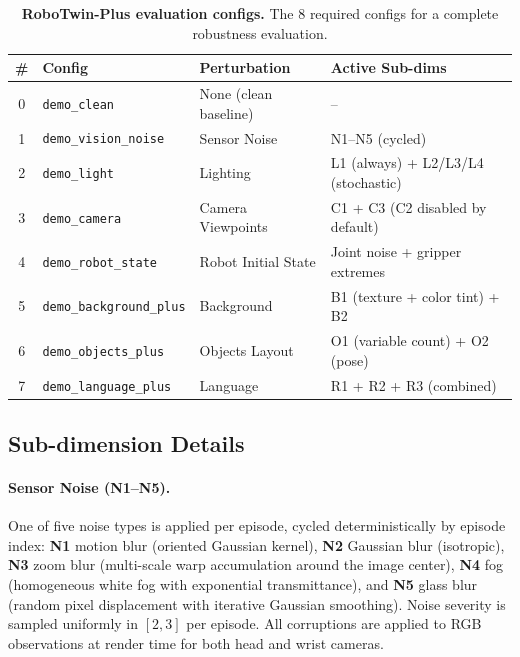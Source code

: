 \documentclass{article}
\begin{document}
\begin{table}[h]
\caption{\textbf{RoboTwin-Plus evaluation configs.} The 8 required configs for a complete robustness evaluation.}
\label{tab:eval_configs}
\centering
\small
\begin{tabular}{@{}clll@{}}
\toprule
\textbf{\#} & \textbf{Config} & \textbf{Perturbation} & \textbf{Active Sub-dims} \\ \midrule
0 & \texttt{demo\_clean} & None (clean baseline) & -- \\
1 & \texttt{demo\_vision\_noise} & Sensor Noise & N1--N5 (cycled) \\
2 & \texttt{demo\_light} & Lighting & L1 (always) + L2/L3/L4 (stochastic) \\
3 & \texttt{demo\_camera} & Camera Viewpoints & C1 + C3 (C2 disabled by default) \\
4 & \texttt{demo\_robot\_state} & Robot Initial State & Joint noise + gripper extremes \\
5 & \texttt{demo\_background\_plus} & Background & B1 (texture + color tint) + B2 \\
6 & \texttt{demo\_objects\_plus} & Objects Layout & O1 (variable count) + O2 (pose) \\
7 & \texttt{demo\_language\_plus} & Language & R1 + R2 + R3 (combined) \\
\bottomrule
\end{tabular}
\end{table}

\subsection{Sub-dimension Details}

\paragraph{Sensor Noise (N1--N5).} One of five noise types is applied per episode, cycled deterministically by episode index: \textbf{N1} motion blur (oriented Gaussian kernel), \textbf{N2} Gaussian blur (isotropic), \textbf{N3} zoom blur (multi-scale warp accumulation around the image center), \textbf{N4} fog (homogeneous white fog with exponential transmittance), and \textbf{N5} glass blur (random pixel displacement with iterative Gaussian smoothing). Noise severity is sampled uniformly in $[2, 3]$ per episode. All corruptions are applied to RGB observations at render time for both head and wrist cameras.
\end{document}
